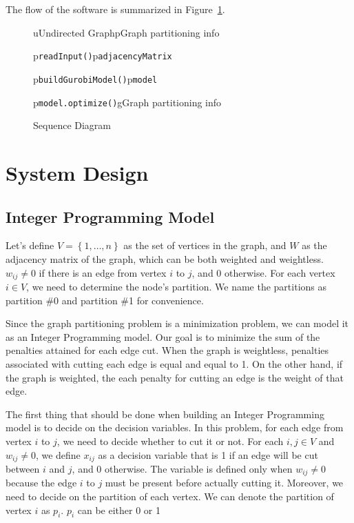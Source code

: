 \documentclass[a4paper,12pt]{report}
\begin{document}
The flow of the software is summarized in Figure~\ref{fig:sequence-diagram}.
\begin{figure}[ht]
	\centering
	\begin{sequencediagram}
	\begin{call}{u}{Undirected Graph}{p}{Graph partitioning info}
		\begin{call}{p}{\texttt{readInput()}}{p}{\texttt{adjacencyMatrix}}
		\end{call}
		\postlevel
		\begin{call}{p}{\texttt{buildGurobiModel()}}{p}{\texttt{model}}
		\end{call}
		\postlevel
		\begin{call}{p}{\texttt{model.optimize()}}{g}{Graph partitioning info}
		\end{call}
	\end{call}
	\end{sequencediagram}
	\caption{Sequence Diagram}
	\label{fig:sequence-diagram}
\end{figure}

\section{System Design}

\subsection{Integer Programming Model}

Let's define \( V = \left\{ 1,\dots,n \right\} \) as the set of vertices in the graph, and \( W \) as the adjacency matrix of the graph, which can be both weighted and weightless. \( w_{ij} \neq 0 \) if there is an edge from vertex \( i \) to \( j \), and 0 otherwise. For each vertex \( i \in V\), we need to determine the node's partition. We name the partitions as 
partition \#0 and partition \#1 for convenience.

Since the graph partitioning problem is a minimization problem, we can model it as an Integer Programming model. Our goal is to minimize the sum of the penalties attained for each edge cut. When the graph is weightless, penalties associated with cutting each edge is equal and equal to 1. On the other hand, if the graph is weighted, the each penalty for cutting an edge is the weight of that edge.

The first thing that should be done when building an Integer Programming model is to decide on the decision variables. In this problem, for each edge from vertex \(i\) to \(j\), we need to decide whether to cut it or not. For each \( i,j \in V\) and \( w_{ij} \neq 0 \), we define \( x_{ij} \) as a decision variable that is 1 if an edge will be cut between \( i \) and \( j \), and 0 otherwise. The variable is defined only when \( w_{ij} \neq 0 \) because the edge \(i\) to \(j\) must be present before actually cutting it. Moreover, we need to decide on the partition of each vertex. We can denote the partition of vertex \( i \) as \( p_i \). \( p_i \) can be either 0 or 1
\end{document}
